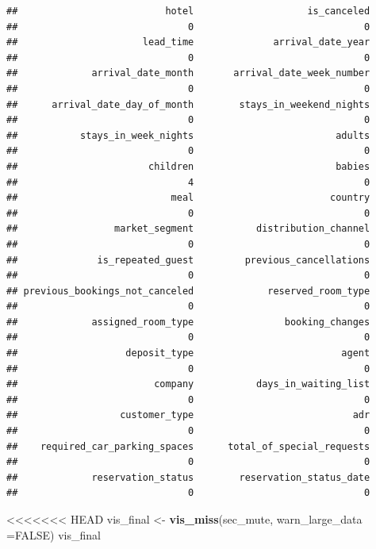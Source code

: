 \documentclass[11pt,a4paper,]{article}
\newenvironment{Shaded}{\begin{snugshade}}{\end{snugshade}}
\newcommand{\DataTypeTok}[1]{\textcolor[rgb]{0.13,0.29,0.53}{#1}}
\newcommand{\KeywordTok}[1]{\textcolor[rgb]{0.13,0.29,0.53}{\textbf{#1}}}
\newcommand{\NormalTok}[1]{#1}
\newcommand{\OtherTok}[1]{\textcolor[rgb]{0.56,0.35,0.01}{#1}}
\newcommand{\StringTok}[1]{\textcolor[rgb]{0.31,0.60,0.02}{#1}}
\begin{document}
\begin{verbatim}
##                          hotel                    is_canceled 
##                              0                              0 
##                      lead_time              arrival_date_year 
##                              0                              0 
##             arrival_date_month       arrival_date_week_number 
##                              0                              0 
##      arrival_date_day_of_month        stays_in_weekend_nights 
##                              0                              0 
##           stays_in_week_nights                         adults 
##                              0                              0 
##                       children                         babies 
##                              4                              0 
##                           meal                        country 
##                              0                              0 
##                 market_segment           distribution_channel 
##                              0                              0 
##              is_repeated_guest         previous_cancellations 
##                              0                              0 
## previous_bookings_not_canceled             reserved_room_type 
##                              0                              0 
##             assigned_room_type                booking_changes 
##                              0                              0 
##                   deposit_type                          agent 
##                              0                              0 
##                        company           days_in_waiting_list 
##                              0                              0 
##                  customer_type                            adr 
##                              0                              0 
##    required_car_parking_spaces      total_of_special_requests 
##                              0                              0 
##             reservation_status        reservation_status_date 
##                              0                              0
\end{verbatim}

\begin{Shaded}
\begin{Highlighting}[]
<<<<<<< HEAD
\NormalTok{vis_final <-}\StringTok{ }\KeywordTok{vis_miss}\NormalTok{(sec_mute, }\DataTypeTok{warn_large_data =}\OtherTok{FALSE}\NormalTok{)}
\NormalTok{vis_final}
\end{Highlighting}
\end{Shaded}
\end{document}

